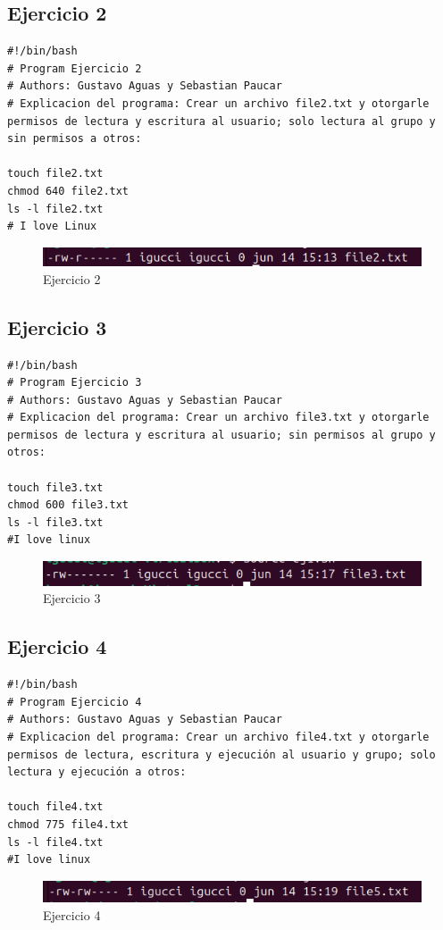 \documentclass[11pt,twoside]{book}
\begin{document}
\subsection{Ejercicio 2}
\begin{lstlisting}
#!/bin/bash
# Program Ejercicio 2
# Authors: Gustavo Aguas y Sebastian Paucar
# Explicacion del programa: Crear un archivo file2.txt y otorgarle permisos de lectura y escritura al usuario; solo lectura al grupo y sin permisos a otros:

touch file2.txt
chmod 640 file2.txt
ls -l file2.txt
# I love Linux
\end{lstlisting}
\begin{figure}[h]
    \centering
    \includegraphics[width=1\linewidth]{pnum/ej2.png}
    \caption{Ejercicio 2}
\end{figure}

\subsection{Ejercicio 3}
\begin{lstlisting}
#!/bin/bash
# Program Ejercicio 3
# Authors: Gustavo Aguas y Sebastian Paucar
# Explicacion del programa: Crear un archivo file3.txt y otorgarle permisos de lectura y escritura al usuario; sin permisos al grupo y otros:

touch file3.txt
chmod 600 file3.txt
ls -l file3.txt
#I love linux
\end{lstlisting}
\begin{figure}[h]
    \centering
    \includegraphics[width=1\linewidth]{pnum/ej3.png}
    \caption{Ejercicio 3}
\end{figure}

\subsection{Ejercicio 4}
\begin{lstlisting}
#!/bin/bash
# Program Ejercicio 4
# Authors: Gustavo Aguas y Sebastian Paucar
# Explicacion del programa: Crear un archivo file4.txt y otorgarle permisos de lectura, escritura y ejecución al usuario y grupo; solo lectura y ejecución a otros:

touch file4.txt
chmod 775 file4.txt
ls -l file4.txt
#I love linux
\end{lstlisting}
\begin{figure}[h]
    \centering
    \includegraphics[width=1\linewidth]{pnum/ej5.png}
    \caption{Ejercicio 4}
\end{figure}
\end{document}
